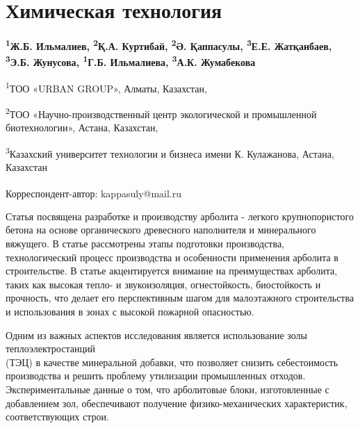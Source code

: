 \let\cleardoublepage\clearpage
\chapter{Химическая технология}

\begin{articleheader}

{\bfseries
\textsuperscript{1}Ж.Б. Ильмалиев,
\textsuperscript{2}Қ.А. Куртибай,
\textsuperscript{2}Ә. Қаппасулы\textsuperscript{\envelope },
\textsuperscript{3}Е.Е. Жатқанбаев,
\textsuperscript{3}Э.Б. Жунусова,
\textsuperscript{1}Г.Б. Ильмалиева,
\textsuperscript{3}А.К. Жумабекова
}
\end{articleheader}

\begin{affiliation}
\textsuperscript{1}ТОО «URBAN GROUP», Алматы, Казахстан,

\textsuperscript{2}ТОО «Научно-производственный центр экологической и промышленной биотехнологии», Астана, Казахстан,

\textsuperscript{3}Казахский университет технологии и бизнеса имени К. Кулажанова, Астана, Казахстан

\raggedright \textsuperscript{\envelope }Корреспондент-автор: kappasuly@mail.ru
\end{affiliation}

Статья посвящена разработке и производству арболита - легкого
крупнопористого бетона на основе органического древесного наполнителя и
минерального вяжущего. В статье рассмотрены этапы подготовки
производства, технологический процесс производства и особенности
применения арболита в строительстве. В статье акцентируется внимание на
преимуществах арболита, таких как высокая тепло- и звукоизоляция,
огнестойкость, биостойкость и прочность, что делает его перспективным
шагом для малоэтажного строительства и использования в зонах с высокой
пожарной опасностью.

Одним из важных аспектов исследования является использование золы
теплоэлектростанций \\(ТЭЦ) в качестве минеральной добавки, что позволяет
снизить себестоимость производства и решить проблему утилизации
промышленных отходов. Экспериментальные данные о том, что арболитовые
блоки, изготовленные с добавлением зол, обеспечивают получение
физико-механических характеристик, соответствующих строи.

